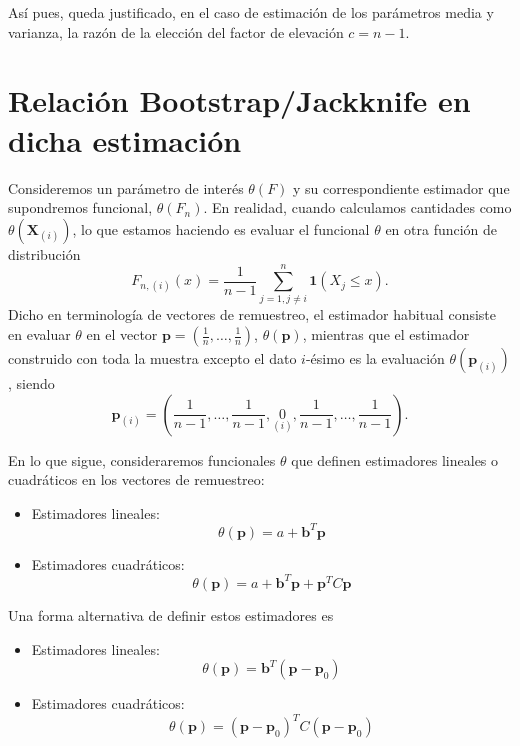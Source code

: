 \documentclass[
]{book}
\renewcommand{\mathbf}[1]{\symbf{#1}}
\theoremstyle{break}
\theoremstyle{nonumberplain}
\begin{document}
Así pues, queda justificado, en el caso de estimación de los parámetros
media y varianza, la razón de la elección del factor de elevación
\(c=n-1\).

\section{Relación Bootstrap/Jackknife en dicha estimación}\label{relaciuxf3n-bootstrapjackknife-en-dicha-estimaciuxf3n}

Consideremos un parámetro de interés \(\theta \left( F \right)\) y su
correspondiente estimador que supondremos funcional, \(\theta \left(
F_n \right)\). En realidad, cuando calculamos cantidades como \(\theta
\left( \mathbf{X}_{(i)} \right)\), lo que estamos
haciendo es evaluar el funcional \(\theta\) en otra función de
distribución\[F_{n,(i)}\left( x \right) =\frac{1}{n-1}\sum_{j=1,j\neq i}^{n}
\mathbf{1}\left( X_j\leq x \right).\]Dicho en terminología de vectores
de remuestreo, el estimador habitual consiste en evaluar \(\theta\) en el
vector \(\mathbf{p}=\left( \frac{1}{n},\ldots ,\frac{1}{n} \right)\),
\(\theta \left( \mathbf{p} \right)\), mientras que el estimador
construido con toda la muestra excepto el dato \(i\)-ésimo es la evaluación
\(\theta \left( \mathbf{p}_{(i)} \right)\), siendo
\[\mathbf{p}_{(i)}=\left( \frac{1}{n-1},\ldots ,\frac{1}{n-1},
\underset{(i)}{0},\frac{1}{n-1},\ldots ,\frac{1}{n-1} \right).\]

En lo que sigue, consideraremos funcionales \(\theta\) que definen
estimadores lineales o cuadráticos en los vectores de remuestreo:

\begin{itemize}
\item
  Estimadores lineales:
  \[\theta \left( \mathbf{p} \right) = a+\mathbf{b}^{T} \mathbf{p}\]
\item
  Estimadores cuadráticos:
  \[\theta \left( \mathbf{p} \right) = a+\mathbf{b}^{T}
  \mathbf{p}+\mathbf{p}^{T}C\mathbf{p}\]
\end{itemize}

Una forma alternativa de definir estos estimadores es

\begin{itemize}
\item
  Estimadores lineales:
  \[\theta \left( \mathbf{p} \right) = \mathbf{b}^{T}
  \left( \mathbf{p}-\mathbf{p}_{0} \right) \]
\item
  Estimadores cuadráticos:
  \[\theta \left( \mathbf{p} \right) = \left( \mathbf{p}-\mathbf{p}_{0} \right)^{T}
  C\left( \mathbf{p}-\mathbf{p}_{0} \right)\]
\end{itemize}
\end{document}

